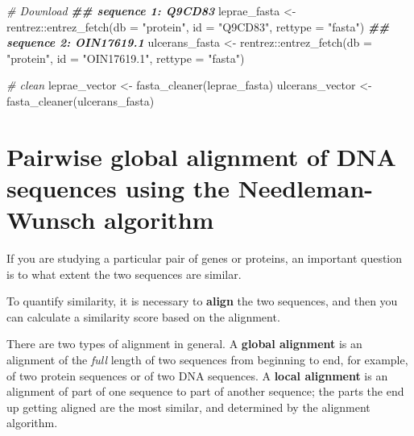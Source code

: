 \documentclass[
]{book}
\newenvironment{Shaded}{\begin{snugshade}}{\end{snugshade}}
\newcommand{\AttributeTok}[1]{\textcolor[rgb]{0.77,0.63,0.00}{#1}}
\newcommand{\CommentTok}[1]{\textcolor[rgb]{0.56,0.35,0.01}{\textit{#1}}}
\newcommand{\DocumentationTok}[1]{\textcolor[rgb]{0.56,0.35,0.01}{\textbf{\textit{#1}}}}
\newcommand{\FunctionTok}[1]{\textcolor[rgb]{0.00,0.00,0.00}{#1}}
\newcommand{\NormalTok}[1]{#1}
\newcommand{\OtherTok}[1]{\textcolor[rgb]{0.56,0.35,0.01}{#1}}
\newcommand{\SpecialCharTok}[1]{\textcolor[rgb]{0.00,0.00,0.00}{#1}}
\newcommand{\StringTok}[1]{\textcolor[rgb]{0.31,0.60,0.02}{#1}}
\begin{document}
\begin{Shaded}
\begin{Highlighting}[]
\CommentTok{\# Download}
\DocumentationTok{\#\# sequence 1: Q9CD83}
\NormalTok{leprae\_fasta }\OtherTok{\textless{}{-}}\NormalTok{ rentrez}\SpecialCharTok{::}\FunctionTok{entrez\_fetch}\NormalTok{(}\AttributeTok{db =} \StringTok{"protein"}\NormalTok{,}
                        \AttributeTok{id =} \StringTok{"Q9CD83"}\NormalTok{,}
                         \AttributeTok{rettype =} \StringTok{"fasta"}\NormalTok{)}
\DocumentationTok{\#\# sequence 2: OIN17619.1}
\NormalTok{ulcerans\_fasta }\OtherTok{\textless{}{-}}\NormalTok{ rentrez}\SpecialCharTok{::}\FunctionTok{entrez\_fetch}\NormalTok{(}\AttributeTok{db =} \StringTok{"protein"}\NormalTok{,}
                         \AttributeTok{id =} \StringTok{"OIN17619.1"}\NormalTok{,}
                         \AttributeTok{rettype =} \StringTok{"fasta"}\NormalTok{)}

\CommentTok{\# clean}
\NormalTok{leprae\_vector   }\OtherTok{\textless{}{-}} \FunctionTok{fasta\_cleaner}\NormalTok{(leprae\_fasta)}
\NormalTok{ulcerans\_vector }\OtherTok{\textless{}{-}} \FunctionTok{fasta\_cleaner}\NormalTok{(ulcerans\_fasta)}
\end{Highlighting}
\end{Shaded}

\hypertarget{pairwise-global-alignment-of-dna-sequences-using-the-needleman-wunsch-algorithm}{%
\section{Pairwise global alignment of DNA sequences using the Needleman-Wunsch algorithm}\label{pairwise-global-alignment-of-dna-sequences-using-the-needleman-wunsch-algorithm}}

If you are studying a particular pair of genes or proteins, an important question is to what extent the two sequences are similar.

To quantify similarity, it is necessary to \textbf{align} the two sequences, and then you can calculate a similarity score based on the alignment.

There are two types of alignment in general. A \textbf{global alignment} is an alignment of the \emph{full} length of two sequences from beginning to end, for example, of two protein sequences or of two DNA sequences. A \textbf{local alignment} is an alignment of part of one sequence to part of another sequence; the parts the end up getting aligned are the most similar, and determined by the alignment algorithm.
\end{document}
